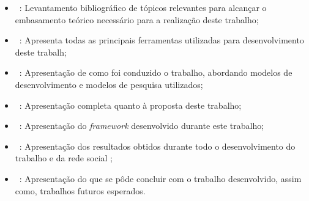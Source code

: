 \begin{itemize}
	\item ~: Levantamento bibliográfico de tópicos relevantes para alcançar o embasamento teórico necessário para a realização deste trabalho;
	\item ~: Apresenta todas as principais ferramentas utilizadas para desenvolvimento deste trabalh;
	\item ~: Apresentação de como foi conduzido o trabalho, abordando modelos de desenvolvimento e modelos de pesquisa utilizados;
	\item ~: Apresentação completa quanto à proposta deste trabalho;
	\item ~: Apresentação do \textit{framework} desenvolvido durante este trabalho;
	\item ~: Apresentação dos resultados obtidos durante todo o desenvolvimento do trabalho e da rede social ;
	\item ~: Apresentação do que se pôde concluir com o trabalho desenvolvido, assim como, trabalhos futuros esperados.
\end{itemize}
